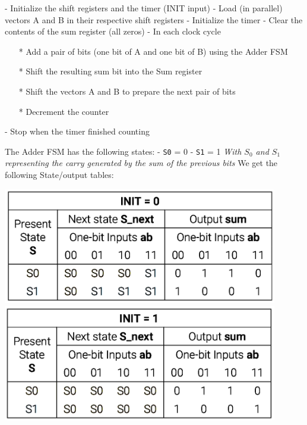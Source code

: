 \documentclass[12pt,openany]{book}
\begin{document}
\begin{minipage}[htp]{0.45\textwidth}

	\begin{justify}

			- Initialize the shift registers and the timer (INIT input)
			\newline
			- Load (in parallel) vectors A and B in their respective shift registers
			\newline
			- Initialize the timer
			\newline
			- Clear the contents of the sum register (all zeros)
			\newline
			- In each clock cycle
			\newline
			\begin{itemize}
				\setlength\itemsep{-5px}
				\item[*] Add a pair of bits (one bit of A and one bit of B) using the Adder FSM
				\item[*] Shift the resulting sum bit into the Sum register
				\item[*] Shift the vectors A and B to prepare the next pair of bits
				\item[*] Decrement the counter
			\end{itemize}
			- Stop when the timer finished counting
	\end{justify}
\end{minipage}
\hfill
\vline
\hfill
\begin{minipage}[htp]{0.45\textwidth}
The Adder FSM has the following states:
\newline
- \texttt{S0} = 0
\newline
- \texttt{S1} = 1
\newline
\textit{With $S_0$ and $S_1$ representing the carry generated by the sum of the previous bits}
\newline
We get the following State/output tables:
\newline
\begin{center}
	\includegraphics[width=0.9\textwidth]{circuits/18.3.2.png}
	\includegraphics[width=0.9\textwidth]{circuits/18.3.2_2.png}
\end{center}
\end{minipage}
\end{document}
